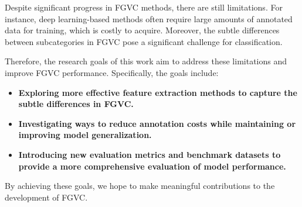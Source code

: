 Despite significant progress in FGVC methods, there are still limitations. For instance, deep learning-based methods often require large amounts of annotated data for training, which is costly to acquire. Moreover, the subtle differences between subcategories in FGVC pose a significant challenge for classification.

Therefore, the research goals of this work aim to address these limitations and improve FGVC performance. Specifically, the goals include:
\begin{itemize}
    \item \textbf{Exploring more effective feature extraction methods to capture the subtle differences in FGVC.}
    \item \textbf{Investigating ways to reduce annotation costs while maintaining or improving model generalization.}
    \item \textbf{Introducing new evaluation metrics and benchmark datasets to provide a more comprehensive evaluation of model performance.}
\end{itemize}
By achieving these goals, we hope to make meaningful contributions to the development of FGVC.

